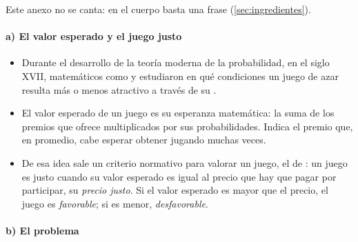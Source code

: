 \documentclass[11pt]{article}
\begin{document}
Este anexo no se canta: en el cuerpo basta una frase (\ref{sec:ingredientes}).

\paragraph{a) El valor esperado y el juego justo}

\begin{itemize}
\item Durante el desarrollo de la teoría moderna de la probabilidad, en el siglo XVII, matemáticos como  y  estudiaron en qué condiciones un juego de azar resulta más o menos atractivo a través de su .
\item El valor esperado de un juego es su esperanza matemática: la suma de los premios que ofrece multiplicados por sus probabilidades. Indica el premio que, en promedio, cabe esperar obtener jugando muchas veces.
\item De esa idea sale un criterio normativo para valorar un juego, el de : un juego es justo cuando su valor esperado es igual al precio que hay que pagar por participar, su \emph{precio justo}. Si el valor esperado es mayor que el precio, el juego es \emph{favorable}; si es menor, \emph{desfavorable}.
\end{itemize}

\paragraph{b) El problema}
\end{document}
